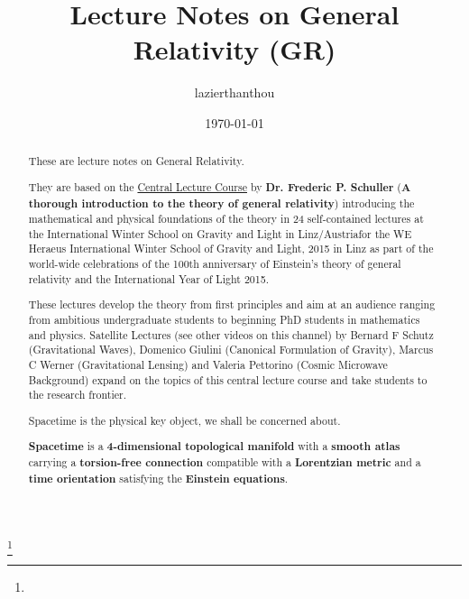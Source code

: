 \documentclass[10pt,a4paper,oneside]{article}
\theoremstyle{plain}
\theoremstyle{definition}
\theoremstyle{remark}
\numberwithin{equation}{section}
\begin{document}

\title{Lecture Notes on General Relativity (GR)}
\author{lazierthanthou}
\thanks{}
\date{\today}

\maketitle

\tableofcontents

\begin{abstract}
These are lecture notes on General Relativity.

They are based on the \href{https://www.youtube.com/channel/UCUHKG3S9N_QeIE2jQXd2-VQ/feed}{Central Lecture Course} by \textbf{Dr. Frederic P. Schuller} (\textbf{A thorough introduction to the theory of general relativity}) introducing the mathematical and physical foundations of the theory in 24 self-contained lectures at the International Winter School on Gravity and Light in Linz/Austriafor the WE Heraeus International Winter School of Gravity and Light, 2015 in Linz as part of the world-wide celebrations of the 100th anniversary of Einstein's theory of general relativity and the International Year of Light 2015.

These lectures develop the theory from first principles and aim at an audience ranging from ambitious undergraduate students to beginning PhD students in mathematics and physics. Satellite Lectures (see other videos on this channel) by Bernard F Schutz (Gravitational Waves), Domenico Giulini (Canonical Formulation of Gravity), Marcus C Werner (Gravitational Lensing) and Valeria Pettorino (Cosmic Microwave Background) expand on the topics of this central lecture course and take students to the research frontier.

Spacetime is the physical key object, we shall be concerned about.

\begin{framed}
\textbf{Spacetime} is a \textbf{4-dimensional topological manifold} with a \textbf{smooth atlas} carrying a \textbf{torsion-free connection} compatible with a \textbf{Lorentzian metric} and a \textbf{time orientation} satisfying the \textbf{Einstein equations}.
\end{framed}

\end{abstract}
\end{document}
